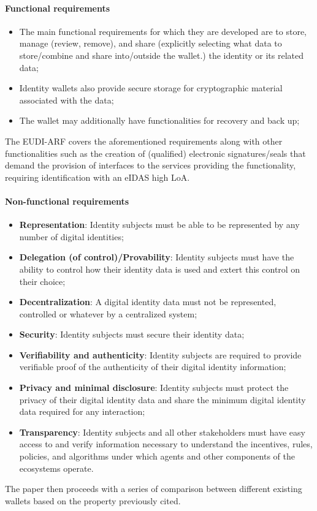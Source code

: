 \documentclass{article}
\begin{document}
\paragraph{Functional requirements}
\begin{itemize}
      \item  The main functional requirements for which they are developed 
      are to store, manage (review, remove), and share (explicitly selecting 
      what data to store/combine and share into/outside the wallet.) 
      the identity or its related data;
      \item Identity wallets also provide secure storage for 
      cryptographic material associated with the data;
      \item The wallet may additionally have functionalities for recovery and back up;
\end{itemize}
The EUDI-ARF covers the aforementioned requirements along with other
functionalities such as the creation of (qualified) electronic signatures/seals that
demand the provision of interfaces to the services providing the functionality,
requiring identification with an eIDAS high LoA.
\paragraph{Non-functional requirements}
\begin{itemize}
      \item \textbf{Representation}: Identity subjects must be able to be represented by any number of digital identities;
      \item \textbf{Delegation (of control)/Provability}: Identity subjects must have the ability to control how their identity data is used and extert this control on their choice;
      \item \textbf{Decentralization}: A digital identity data must not be represented, controlled or whatever by a centralized system;
      \item \textbf{Security}: Identity subjects must secure their identity data;
      \item \textbf{Verifiability and authenticity}: Identity subjects are required to provide verifiable proof of the authenticity of their digital identity information;
      \item \textbf{Privacy and minimal disclosure}: Identity subjects must protect the privacy of their digital identity data and share the minimum digital identity data required for any interaction;
      \item \textbf{Transparency}: Identity subjects and all other stakeholders must have easy access to and verify information necessary to understand the incentives, rules, policies, and  algorithms under which agents and other components of the ecosystems operate.
\end{itemize}
The paper then proceeds with a series of comparison between different existing wallets
based on the property previously cited.
\end{document}
